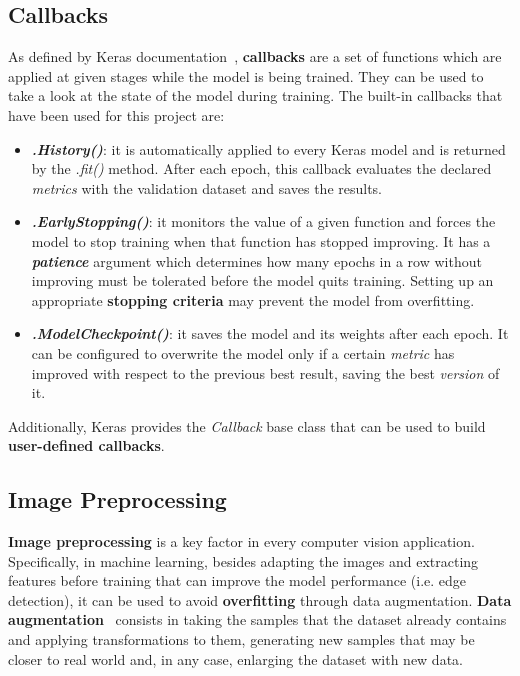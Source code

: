 \subsection{Callbacks} \label{subsec:callbacks}
As defined by Keras documentation~\cite{chollet2015keras}, \textbf{callbacks} are a set of functions which are applied at given stages while the model is being trained. They can be used to take a look at the state of the model during training. The built-in callbacks that have been used for this project are:
\begin{itemize}
	\item \textbf{\textit{.History()}}: it is automatically applied to every Keras model and is returned by the \textit{.fit()} method. After each epoch, this callback evaluates the declared \textit{metrics} with the validation dataset and saves the results.
	
	\item \textbf{\textit{.EarlyStopping()}}: it monitors the value of a given function and forces the model to stop training when that function has stopped improving. It has a \textbf{\textit{patience}} argument which determines how many epochs in a row without improving must be tolerated before the model quits training. Setting up an appropriate \textbf{stopping criteria} may prevent the model from overfitting.
	
	\item \textbf{\textit{.ModelCheckpoint()}}: it saves the model and its weights after each epoch. It can be configured to overwrite the model only if a certain \textit{metric} has improved with respect to the previous best result, saving the best \textit{version} of it.
\end{itemize}

Additionally, Keras provides the \textit{Callback} base class that can be used to build \textbf{user-defined callbacks}.

\subsection{Image Preprocessing}\label{subsec:utils}
\textbf{Image preprocessing} is a key factor in every computer vision application. Specifically, in machine learning, besides adapting the images and extracting features before training that can improve the model performance (i.e. edge detection), it can be used to avoid \textbf{overfitting} through data augmentation. \textbf{Data augmentation}~\cite{DBLP:journals/corr/WongGSM16} consists in taking the samples that the dataset already contains and applying transformations to them, generating new samples that may be closer to real world and, in any case, enlarging the dataset with new data.

